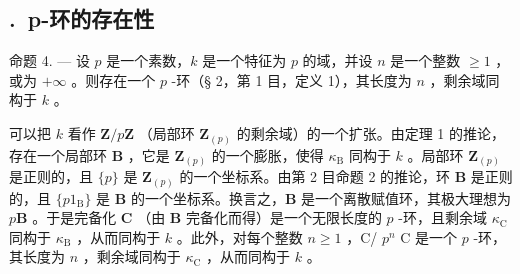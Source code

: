 \subsection*{\theappendixitem.\ p-环的存在性}
{}

命题 4. --- 设 \(p\) 是一个素数，\(k\) 是一个特征为 \(p\) 的域，并设 \(n\) 是一个整数 \(\geqslant 1\) ，或为 \(+\infty\) 。则存在一个 \(p\) -环（§ 2，第 1 目，定义 1），其长度为 \(n\) ，剩余域同构于 \(k\) 。

可以把 \(k\) 看作 \(\mathbf{Z}/p\mathbf{Z}\) （局部环 \(\mathbf{Z}_{(p)}\) 的剩余域）的一个扩张。由定理 1 的推论，存在一个局部环 \(\mathbf{B}\) ，它是 \(\mathbf{Z}_{(p)}\) 的一个膨胀，使得 \(\kappa_{\mathrm{B}}\) 同构于 \(k\) 。局部环 \(\mathbf{Z}_{(p)}\) 是正则的，且 \(\{p\}\) 是 \(\mathbf{Z}_{(p)}\) 的一个坐标系。由第 2 目命题 2 的推论，环 \(\mathbf{B}\) 是正则的，且 \(\{p1_{\mathrm{B}}\}\) 是 \(\mathbf{B}\) 的一个坐标系。换言之，\(\mathbf{B}\) 是一个离散赋值环，其极大理想为 \(p\mathbf{B}\) 。于是完备化 \(\mathbf{C}\) （由 \(\mathbf{B}\) 完备化而得）是一个无限长度的 \(p\) -环，且剩余域 \(\kappa_{\mathrm{C}}\) 同构于 \(\kappa_{\mathrm{B}}\) ，从而同构于 \(k\) 。此外，对每个整数 \(n \geqslant 1\) ，C/ \(p^{n}\) C 是一个 \(p\) -环，其长度为 \(n\) ，剩余域同构于 \(\kappa_{\mathrm{C}}\) ，从而同构于 \(k\) 。


